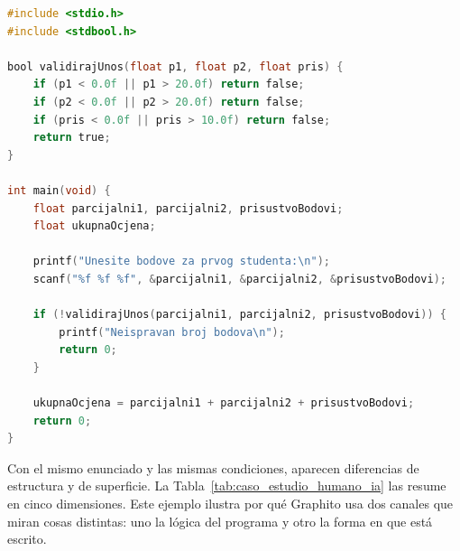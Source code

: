 \begin{lstlisting}[language=C, caption={Código sintético: generado por IA en serbocroata (perfil aplicado).}, label={lst:codigo_ia_srb}]
#include <stdio.h>
#include <stdbool.h>

bool validirajUnos(float p1, float p2, float pris) {
    if (p1 < 0.0f || p1 > 20.0f) return false;
    if (p2 < 0.0f || p2 > 20.0f) return false;
    if (pris < 0.0f || pris > 10.0f) return false;
    return true;
}

int main(void) {
    float parcijalni1, parcijalni2, prisustvoBodovi;
    float ukupnaOcjena;

    printf("Unesite bodove za prvog studenta:\n");
    scanf("%f %f %f", &parcijalni1, &parcijalni2, &prisustvoBodovi);

    if (!validirajUnos(parcijalni1, parcijalni2, prisustvoBodovi)) {
        printf("Neispravan broj bodova\n");
        return 0;
    }

    ukupnaOcjena = parcijalni1 + parcijalni2 + prisustvoBodovi;
    return 0;
}
\end{lstlisting}

Con el mismo enunciado y las mismas condiciones, aparecen diferencias de estructura y de superficie. La Tabla~\ref{tab:caso_estudio_humano_ia} las resume en cinco dimensiones. Este ejemplo ilustra por qué Graphito usa dos canales que miran cosas distintas: uno la lógica del programa y otro la forma en que está escrito.

